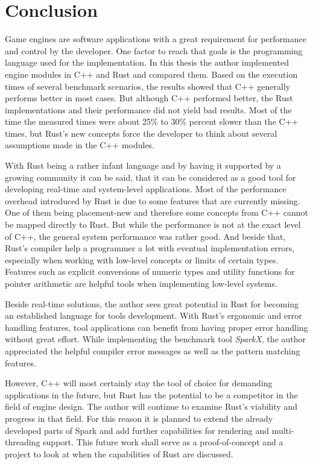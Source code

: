 \chapter{Conclusion}

Game engines are software applications with a great requirement for performance and control by the developer. One factor to reach that goals is the programming language used for the implementation. In this thesis the author implemented engine modules in C++ and Rust and compared them. Based on the execution times of several benchmark scenarios, the results showed that C++ generally performs better in most cases. But although C++ performed better, the Rust implementations and their performance did not yield bad results. Most of the time the measured times were about 25\% to 30\% percent slower than the C++ times, but Rust's new concepts force the developer to think about several assumptions made in the C++ modules.

With Rust being a rather infant language and by having it supported by a growing community it can be said, that it can be considered as a good tool for developing real-time and system-level applications. Most of the performance overhead introduced by Rust is due to some features that are currently missing. One of them being placement-new and therefore some concepts from C++ cannot be mapped directly to Rust. But while the performance is not at the exact level of C++, the general system performance was rather good. And beside that, Rust's compiler help a programmer a lot with eventual implementation errors, especially when working with low-level concepts or limits of certain types. Features such as explicit conversions of numeric types and utility functions for pointer arithmetic are helpful tools when implementing low-level systems.

Beside real-time solutions, the author sees great potential in Rust for becoming an established language for tools development. With Rust's ergonomic and error handling features, tool applications can benefit from having proper error handling without great effort. While implementing the benchmark tool \textit{SparkX}, the author appreciated the helpful compiler error messages as well as the pattern matching features.

However, C++ will most certainly stay the tool of choice for demanding applications in the future, but Rust has the potential to be a competitor in the field of engine design. The author will continue to examine Rust's viability and progress in that field. For this reason it is planned to extend the already developed parts of Spark and add further capabilities for rendering and multi-threading support. This future work shall serve as a proof-of-concept and a project to look at when the capabilities of Rust are discussed. 